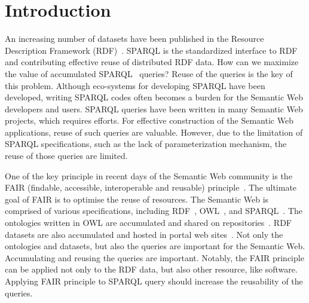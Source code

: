 \documentclass[runningheads]{llncs}
\begin{document}
\section{Introduction}

An increasing number of datasets have been published in the Resource Description Framework (RDF)~\cite{rdf}.
SPARQL is the standardized interface to RDF and contributing effective reuse of distributed RDF data. 
How can we maximize the value of accumulated SPARQL~\cite{sparql} queries?
Reuse of the queries is the key of this problem.
Although eco-systems for developing SPARQL have been developed, writing SPARQL codes often becomes a burden for the Semantic Web developers and users. 
SPARQL queries have been written in many Semantic Web projects, which requires efforts. 
For effective construction of the Semantic Web applications, reuse of such queries are valuable.
However, due to the limitation of SPARQL specifications, such as the lack of parameterization mechanism, the reuse of those queries are limited. 


One of the key principle in recent days of the Semantic Web community is the FAIR (findable, accessible, interoperable and reusable) principle~\cite{fair}.
The ultimate goal of FAIR is to optimise the reuse of resources. 
The Semantic Web is comprised of various specifications, including RDF~\cite{rdf}, OWL~\cite{owl}, and SPARQL~\cite{sparql}. The ontologies written in OWL are accumulated and shared on repositories~\cite{bioportal}.
RDF datasets are also accumulated and hosted in portal web sites~\cite{rdf-portal}.
Not only the ontologies and datasets, but also the queries are important for the Semantic Web.
Accumulating and reusing the queries are important.
Notably, the FAIR principle can be applied not only to the RDF data, but also other resource, like software.
Applying FAIR principle to SPARQL query should increase the reusability of the queries.
\end{document}
